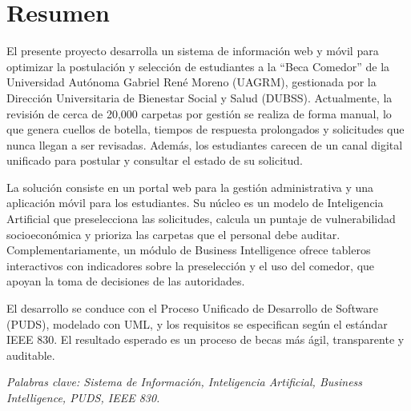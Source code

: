 
\section*{Resumen}

El presente proyecto desarrolla un sistema de información web y móvil para optimizar la postulación y selección de estudiantes a la \enquote{Beca Comedor} de la Universidad Autónoma Gabriel René Moreno (UAGRM), gestionada por la Dirección Universitaria de Bienestar Social y Salud (DUBSS). Actualmente, la revisión de cerca de 20,000 carpetas por gestión se realiza de forma manual, lo que genera cuellos de botella, tiempos de respuesta prolongados y solicitudes que nunca llegan a ser revisadas. Además, los estudiantes carecen de un canal digital unificado para postular y consultar el estado de su solicitud.

La solución consiste en un portal web para la gestión administrativa y una aplicación móvil para los estudiantes. Su núcleo es un modelo de Inteligencia Artificial que preselecciona las solicitudes, calcula un puntaje de vulnerabilidad socioeconómica y prioriza las carpetas que el personal debe auditar. Complementariamente, un módulo de Business Intelligence ofrece tableros interactivos con indicadores sobre la preselección y el uso del comedor, que apoyan la toma de decisiones de las autoridades.

El desarrollo se conduce con el Proceso Unificado de Desarrollo de Software (PUDS), modelado con UML, y los requisitos se especifican según el estándar IEEE 830. El resultado esperado es un proceso de becas más ágil, transparente y auditable.

\indent\textit{Palabras clave: Sistema de Información, Inteligencia Artificial, Business Intelligence, PUDS, IEEE 830.}
